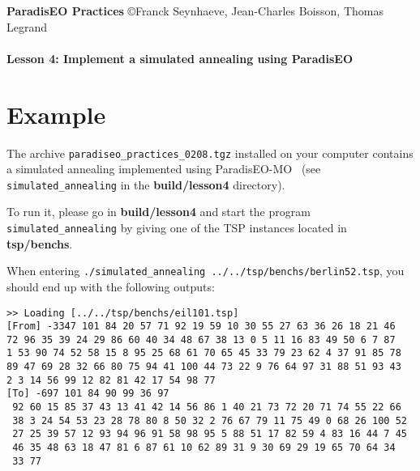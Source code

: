 \documentclass[a4paper]{article}
\begin{document}
\textbf{ParadisEO Practices}  {\copyright Franck Seynhaeve,
Jean-Charles Boisson, Thomas Legrand} \Large{\textbf{\\\\
Lesson 4: Implement a simulated annealing using ParadisEO}}

\normalsize

\vspace{-0,3cm}

\section{Example}

    The archive {\tt paradiseo\_practices\_0208.tgz} installed
    on your computer contains a simulated annealing implemented using ParadisEO-MO~
    (see {\tt simulated\_annealing} in the {\bf build/lesson4} directory).

    \medskip
    To run it, please go in {\bf build/lesson4} and start the program {\tt simulated\_annealing} by giving
    one of the TSP instances located in {\bf tsp/benchs}.


    \medskip
    When entering {\tt ./simulated\_annealing ../../tsp/benchs/berlin52.tsp}, you should end up with the
    following outputs:

    \smallskip
    \noindent
    \texttt{>> Loading [../../tsp/benchs/eil101.tsp]}\\
    \texttt{[From] -3347  101 84 20 57 71 92 19 59 10 30 55 27 63 36 26 18 21 46}\\
    \texttt{72 96 35 39 24 29 86 60 40 34 48 67 38 13 0 5 11 16 83 49 50 6 7 87}\\
    \texttt{1 53 90 74 52 58 15 8 95 25 68 61 70 65 45 33 79 23 62 4 37 91 85 78}\\
    \texttt{89 47 69 28 32 66 80 75 94 41 100 44 73 22 9 76 64 97 31 88 51 93 43}\\
    \texttt{2 3 14 56 99 12 82 81 42 17 54 98 77}\\
    \texttt{[To] -697  101 84 90 99 36 97}\\
    \texttt{ 92 60 15 85 37 43 13 41 42 14 56 86 1 40 21 73 72 20 71 74 55 22 66}\\
    \texttt{ 38 3 24 54 53 23 28 78 80 8 50 32 2 76 67 79 11 75 49 0 68 26 100 52}\\
    \texttt{ 27 25 39 57 12 93 94 96 91 58 98 95 5 88 51 17 82 59 4 83 16 44 7 45}\\
    \texttt{ 46 35 48 63 18 47 81 6 87 61 10 62 89 31 9 30 69 29 19 65 70 64 34}\\
    \texttt{ 33 77}\\
\end{document}
